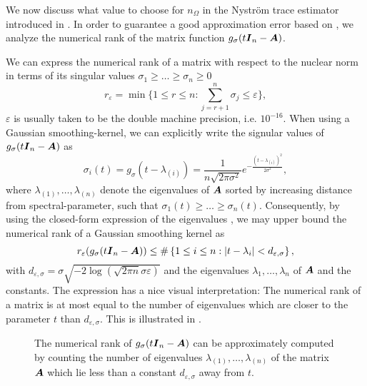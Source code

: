 \documentclass[12pt]{article}
\begin{document}
We now discuss what value to choose for $n_{\Omega}$ in the Nyström trace estimator introduced in . In order to guarantee a good approximation error based on , we analyze the numerical rank of the matrix function $g_{\sigma}(t\boldsymbol{I}_n - \boldsymbol{A})$.

We can express the numerical rank of a matrix with respect to the nuclear norm in terms of its singular values $\sigma_1 \geq \dots \geq \sigma_n \geq 0$
\begin{equation}
    r_{\varepsilon} = \min \{1 \leq r \leq n: \sum_{j=r+1}^n \sigma_{j} \leq \varepsilon \},
    \label{equ:numerical-rank}
\end{equation}
$\varepsilon$ is usually taken to be the double machine precision, i.e. $10^{-16}$. When using a Gaussian smoothing-kernel, we can explicitly write the signular values of $g_{\sigma}(t\boldsymbol{I}_n - \boldsymbol{A})$ as
\begin{equation}
    \sigma_i(t) = g_{\sigma}(t - \lambda_{(i)}) = \frac{1}{n \sqrt{2 \pi \sigma^2}} e^{-\frac{(t - \lambda_{(i)})^2}{2 \sigma^2}},
    \label{equ:gaussian-kernel-eigenvalues}
\end{equation}
where $\lambda_{(1)}, \dots, \lambda_{(n)}$ denote the eigenvalues of $\boldsymbol{A}$ sorted by increasing distance from spectral-parameter, such that $\sigma_1(t) \geq \dots \geq \sigma_n(t)$. Consequently, by using the closed-form expression of the eigenvalues , we may upper bound the numerical rank of a Gaussian smoothing kernel as
\begin{equation}
    r_{\varepsilon}(g_{\sigma}(t\boldsymbol{I}_n - \boldsymbol{A})) \leq \#\left\{1\leq i\leq n: |t - \lambda_i| < d_{\varepsilon, \sigma} \right\},
    \label{equ:gaussian-kernel-numerical-rank}
\end{equation}
with $d_{\varepsilon, \sigma} = \sigma \sqrt{-2 \log(\sqrt{2 \pi n} \sigma \varepsilon)}$ and the eigenvalues $\lambda_1, \dots, \lambda_n$ of $\boldsymbol{A}$ and the constants. The expression  has a nice visual interpretation: The numerical rank of a matrix is at most equal to the number of eigenvalues which are closer to the parameter $t$ than $d_{\varepsilon, \sigma}$. This is illustrated in .
\begin{figure}[ht]
    \centering
    
    \caption{The numerical rank of $g_{\sigma}(t\boldsymbol{I}_n - \boldsymbol{A})$ can be
        approximately computed by counting the number of eigenvalues
        $\lambda_{(1)}, \dots, \lambda_{(n)}$ of the matrix $\boldsymbol{A}$ which lie less than
        a constant $d_{\varepsilon, \sigma}$ away from $t$.}
    \label{fig:numerical-rank}
\end{figure}
\end{document}
